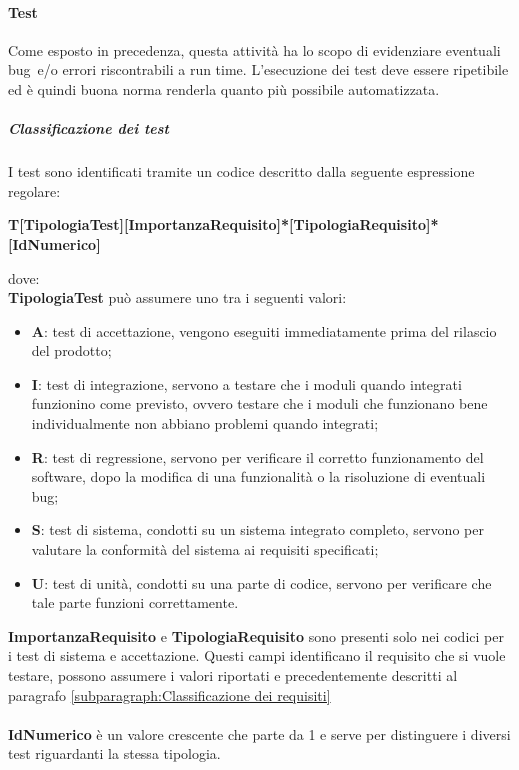         \paragraph{Test}
        Come esposto in precedenza, questa attività ha lo scopo di evidenziare eventuali bug\glo\ e/o errori riscontrabili a run time. L'esecuzione dei test deve essere ripetibile ed è quindi buona norma renderla quanto più possibile automatizzata.

            \subparagraph{Classificazione dei test}
            I test sono identificati tramite un codice descritto dalla seguente espressione regolare:
            \begin{center}
                \large{\textbf{T[TipologiaTest][ImportanzaRequisito]*[TipologiaRequisito]*[IdNumerico]}}
            \end{center}
            dove:\\
            \textbf{TipologiaTest} può assumere uno tra i seguenti valori:
            \begin{itemize}
                \item \textbf{A}: test di accettazione, vengono eseguiti immediatamente prima del rilascio del prodotto;
                \item \textbf{I}: test di integrazione, servono a testare che i moduli quando integrati funzionino come previsto, ovvero testare che i moduli che funzionano bene individualmente non abbiano problemi quando integrati;
                \item \textbf{R}: test di regressione, servono per verificare il corretto funzionamento del software, dopo la modifica di una funzionalità o la risoluzione di eventuali bug;
                \item \textbf{S}: test di sistema, condotti su un sistema integrato completo, servono per valutare la conformità del sistema ai requisiti specificati;
                \item \textbf{U}: test di unità, condotti su una parte di codice, servono per verificare che tale parte funzioni correttamente.
            \end{itemize}
            \textbf{ImportanzaRequisito} e \textbf{TipologiaRequisito} sono presenti solo nei codici per i test di sistema e accettazione. Questi campi identificano il requisito che si vuole testare, possono assumere i valori riportati e precedentemente descritti al paragrafo \ref{subparagraph:Classificazione dei requisiti}\\\\
            \textbf{IdNumerico} è un valore crescente che parte da 1 e serve per distinguere i diversi test riguardanti la stessa tipologia.

